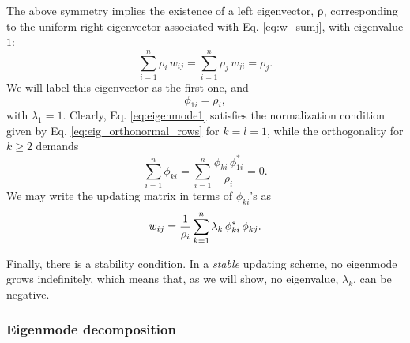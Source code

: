 \documentclass[reprint, superscriptaddress, floatfix]{revtex4-1}
\begin{document}
The above symmetry implies the existence of
a left eigenvector, $\pmb \rho$,
corresponding to the uniform right eigenvector
associated with Eq. \eqref{eq:w_sumj},
with eigenvalue $1$:
%
\begin{equation}
  \sum_{i = 1}^n \rho_i \, w_{ij}
  =
  \sum_{i = 1}^n \rho_j \, w_{ji}
  =
  \rho_j
  .
  \label{eq:w_balance}
\end{equation}
%
We will label this eigenvector as the first one,
and
%
\begin{equation}
  \phi_{1i} = \rho_i,
\label{eq:eigenmode1}
\end{equation}
%
with $\lambda_1 = 1$.
%
Clearly, Eq. \eqref{eq:eigenmode1}
satisfies the normalization condition
given by Eq. \eqref{eq:eig_orthonormal_rows}
for $k = l = 1$,
while the orthogonality for $k \ge 2$ demands
%
\begin{equation}
  \sum_{ i = 1 }^n \phi_{ki}
  =
  \sum_{ i = 1 }^n
    \frac{ \phi_{ki} \, \phi_{1i}^* }
         { \rho_i }
  =
  0
  .
\label{eq:ortho1}
\end{equation}
%
We may write the updating matrix in terms of $\phi_{ki}$'s as
%
\begin{equation}
  w_{ij}
  =
  \frac{1}{\rho_i} \sum_{k=1}^n
  \lambda_k \, \phi_{ki}^* \, \phi_{kj}
  .
  \notag
\end{equation}


Finally, there is a stability condition.
%
In a \emph{stable} updating scheme,
no eigenmode grows indefinitely,
which means that, as we will show, no eigenvalue, $\lambda_k$,
can be negative.




\subsubsection{Eigenmode decomposition}
\end{document}

